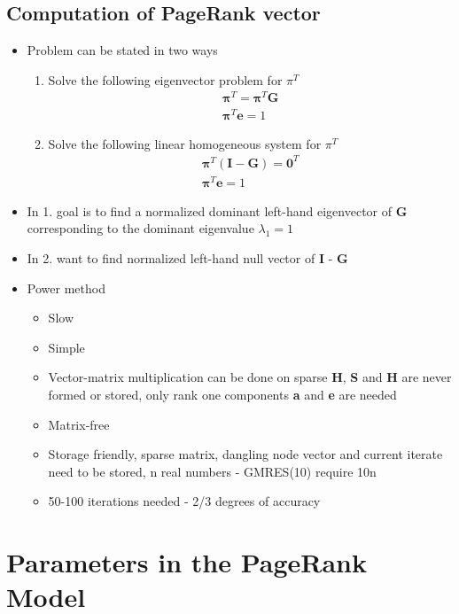 \documentclass[11pt]{report}
\begin{document}
\section{Computation of PageRank vector}
\begin{itemize}
\item Problem can be stated in two ways
\begin{enumerate}
\item Solve the following eigenvector problem for $\pi^T$ \begin{eqnarray}
\boldsymbol{\pi}^T = \boldsymbol{\pi}^T\textbf{G}\\
\boldsymbol{\pi}^T\textbf{e}=1
\end{eqnarray}
\item Solve the following linear homogeneous system for $\pi^T$
\begin{eqnarray}
\boldsymbol{\pi}^T(\textbf{I}-\textbf{G})=\textbf{0}^T\\
\boldsymbol{\pi}^T\textbf{e}=1
\end{eqnarray}
\end{enumerate}
\item In 1. goal is to find a normalized dominant left-hand eigenvector of \textbf{G} corresponding to the dominant eigenvalue $\lambda_1 = 1$
\item In 2. want to find normalized left-hand null vector of \textbf{I} - \textbf{G}
\item Power method
\begin{itemize}
\item Slow
\item Simple
\item Vector-matrix multiplication can be done on sparse \textbf{H}, \textbf{S} and \textbf{H} are never formed or stored, only rank one components \textbf{a} and \textbf{e} are needed
\item Matrix-free
\item Storage friendly, sparse matrix, dangling node vector and current iterate need to be stored, n real numbers - GMRES(10) require 10n
\item 50-100 iterations needed - 2/3 degrees of accuracy
\end{itemize}
\end{itemize}
\chapter{Parameters in the PageRank Model}
\end{document}
